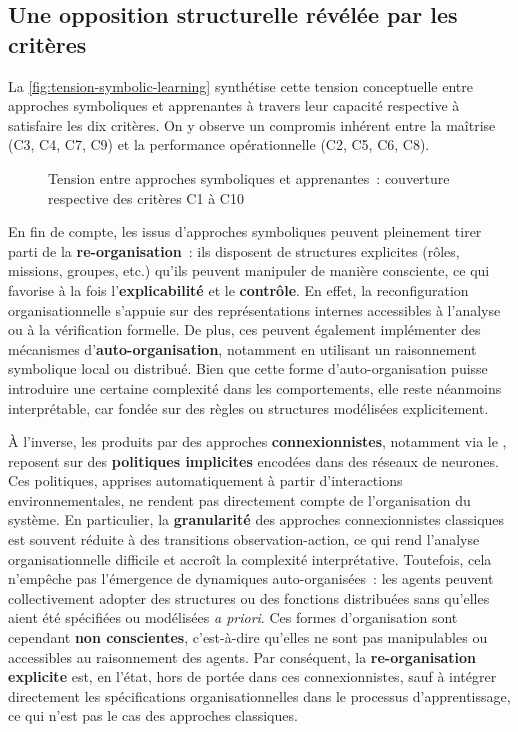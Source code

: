 \subsection{Une opposition structurelle révélée par les critères}

La \autoref{fig:tension-symbolic-learning} synthétise cette tension conceptuelle entre approches symboliques et apprenantes à travers leur capacité respective à satisfaire les dix critères. On y observe un compromis inhérent entre la maîtrise (C3, C4, C7, C9) et la performance opérationnelle (C2, C5, C6, C8).

\begin{figure}[H]
    \centering
    \resizebox{\textwidth}{!}{%
        
    }
    \caption{Tension entre approches symboliques et apprenantes~: couverture respective des critères C1 à C10}
    \label{fig:tension-symbolic-learning}
\end{figure}

En fin de compte, les  issus d'approches symboliques peuvent pleinement tirer parti de la \textbf{re-organisation}~: ils disposent de structures explicites (rôles, missions, groupes, etc.) qu'ils peuvent manipuler de manière consciente, ce qui favorise à la fois l'\textbf{explicabilité} et le \textbf{contrôle}. En effet, la reconfiguration organisationnelle s'appuie sur des représentations internes accessibles à l'analyse ou à la vérification formelle. De plus, ces  peuvent également implémenter des mécanismes d'\textbf{auto-organisation}, notamment en utilisant un raisonnement symbolique local ou distribué. Bien que cette forme d'auto-organisation puisse introduire une certaine complexité dans les comportements, elle reste néanmoins interprétable, car fondée sur des règles ou structures modélisées explicitement.

À l'inverse, les  produits par des approches \textbf{connexionnistes}, notamment via le , reposent sur des \textbf{politiques implicites} encodées dans des réseaux de neurones. Ces politiques, apprises automatiquement à partir d'interactions environnementales, ne rendent pas directement compte de l'organisation du système. En particulier, la \textbf{granularité} des approches connexionnistes classiques est souvent réduite à des transitions observation-action, ce qui rend l'analyse organisationnelle difficile et accroît la complexité interprétative. Toutefois, cela n'empêche pas l'émergence de dynamiques auto-organisées~: les agents peuvent collectivement adopter des structures ou des fonctions distribuées sans qu'elles aient été spécifiées ou modélisées \textit{a priori}. Ces formes d'organisation sont cependant \textbf{non conscientes}, c'est-à-dire qu'elles ne sont pas manipulables ou accessibles au raisonnement des agents. Par conséquent, la \textbf{re-organisation explicite} est, en l'état, hors de portée dans ces  connexionnistes, sauf à intégrer directement les spécifications organisationnelles dans le processus d'apprentissage, ce qui n'est pas le cas des approches  classiques.

